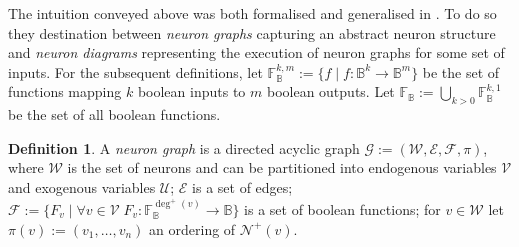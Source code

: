 \documentclass[11pt,a4paper]{book}
\theoremstyle{definition}
\newtheorem{definition}{Definition}[section]
\theoremstyle{definition}
\theoremstyle{definition}
\theoremstyle{remark}
\newcommand{\gtpred}{\mathcal{N}^+}
\newcommand{\gtdegpred}{\deg^+}
\newcommand{\ngraph}{\mathcal{G}}
\newcommand{\ndiagram}{\mathcal{D}}
\newcommand{\cfoos}{\mathcal{F}}
\newcommand{\cvars}{\mathcal{W}}
\newcommand{\cenvars}{\mathcal{V}}
\newcommand{\cexvars}{\mathcal{U}}
\newcommand{\crel}{\mathcal{E}}
\newcommand{\cbinfoos}{\mathbb{F}_{\mathbb{B}}}
\begin{document}
%
%
%
%
%




The intuition conveyed above was both formalised and generalised in \cite{erwig2010causal}. To do so they destination between \emph{neuron graphs} capturing an abstract neuron structure and \emph{neuron diagrams} representing the execution of neuron graphs for some set of inputs. For the subsequent definitions, let $\mathbb{F}_{\mathbb{B}}^{k,m}:= \{f \mid f:\mathbb{B}^k\to \mathbb{B}^m\}$ be the set of functions mapping $k$ boolean inputs to $m$ boolean outputs. 
Let $\cbinfoos := \bigcup_{k>0} \mathbb{F}_{\mathbb{B}}^{k,1}$ be the set of all boolean functions. 

\begin{definition}
A \emph{neuron graph} is a directed acyclic graph $\ngraph:=(\cvars, \crel, \cfoos, \pi)$, where $\cvars$ is the set of neurons and can be partitioned into endogenous variables $\cenvars$ and exogenous variables $\cexvars$; $\crel$ is a set of edges; 
 $\cfoos:=\{ F_v \mid \forall v \in \cenvars \; F_v : \cbinfoos^{\gtdegpred(v)} \to \mathbb{B} \}$ is a set of boolean functions;  for $v \in \cvars$ let $\pi(v):= (v_1,\dots, v_n) $ an ordering of $\gtpred(v)$.
\end{definition}
\end{document}
